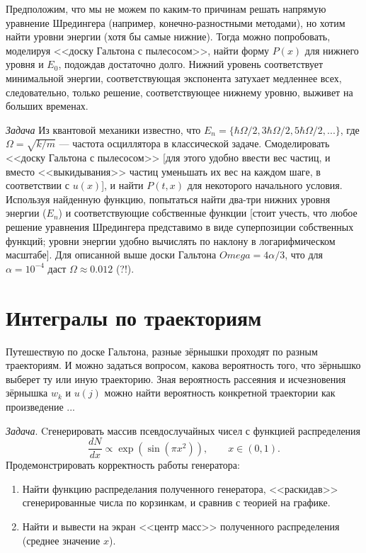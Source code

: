 \documentclass{book}
\begin{document}
Предположим, что мы не можем по каким-то причинам решать напрямую уравнение Шредингера (например,
конечно-разностными методами), но хотим найти уровни энергии (хотя бы самые нижние). Тогда можно
попробовать, моделируя <<доску Гальтона с пылесосом>>, найти форму $P(x)$ для нижнего уровня и $E_0$,
подождав достаточно долго. Нижний уровень соответствует минимальной энергии, соответствующая
экспонента затухает медленнее всех, следовательно, только решение, соответствующее нижнему уровню,
выживет на больших временах.

\textit{Задача}
Из квантовой механики известно, что $E_n = \{\hbar \Omega / 2, 3 \hbar \Omega / 2, 5 \hbar \Omega /
2, ...\}$, где $\Omega = \sqrt{k / m}$ --- частота осциллятора в классической задаче. Смоделировать
<<доску Гальтона с пылесосом>> [для этого удобно ввести вес частиц, и вместо <<выкидывания>> частиц
уменьшать их вес на каждом шаге, в соответствии с $u(x)$], и найти $P(t, x)$ для некоторого
начального условия.  Используя найденную функцию, попытаться найти два-три нижних уровня энергии
($E_n$) и соответствующие собственные функции [стоит учесть, что любое решение уравнения Шредингера
представимо в виде суперпозиции собственных функций; уровни энергии удобно вычислять по наклону в
логарифмическом масштабе]. Для описанной выше доски Гальтона $Omega = 4 \alpha / 3$, что для
$\alpha = 10^{-4}$ даст $\Omega \approx 0.012$ (?!).

\section{Интегралы по траекториям}

Путешествую по доске Гальтона, разные зёрнышки проходят по разным траекториям. И можно задаться
вопросом, какова вероятность того, что зёрнышко выберет ту или иную траекторию. Зная вероятность
рассеяния и исчезновения зёрнышка $w_k$ и $u(j)$ можно найти вероятность конкретной траектории как
произведение ...

\clearpage

\textit{Задача}. Cгенерировать массив псевдослучайных чисел с функцией распределения
\begin{equation}
    \frac{dN}{dx} \propto \exp(\sin(\pi x^2)), \qquad x \in (0, 1).
\end{equation}
Продемонстрировать корректность работы генератора:
\begin{enumerate}
  \item Найти функцию распределания полученного генератора, <<раскидав>> сгенерированные числа по
      корзинкам, и сравнив с теорией на графике.
  \item Найти и вывести на экран <<центр масс>> полученного распределения (среднее значение $x$).
\end{enumerate}
\end{document}
